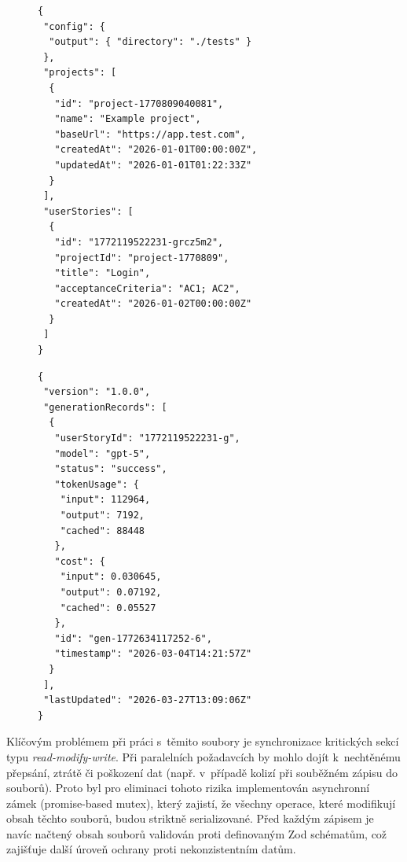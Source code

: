 \documentclass[czech, ing, kiv, he, iso690numb, viewonly]{fasthesis}
\begin{document}
\begin{figure}[H]
    \centering
    \begin{minipage}[t]{0.47\textwidth}
\begin{lstlisting}[style=jsoncode, basicstyle=\ttfamily\tiny, breaklines=true, breakatwhitespace=true, xleftmargin=1.5em, caption={\protect\centering Struktura \texttt{test-pilot.json}.}, label={lst:test-pilot-structure}]
{
 "config": {
  "output": { "directory": "./tests" }
 },
 "projects": [
  {
   "id": "project-1770809040081",
   "name": "Example project",
   "baseUrl": "https://app.test.com",
   "createdAt": "2026-01-01T00:00:00Z",
   "updatedAt": "2026-01-01T01:22:33Z"
  }
 ],
 "userStories": [
  {
   "id": "1772119522231-grcz5m2",
   "projectId": "project-1770809",
   "title": "Login",
   "acceptanceCriteria": "AC1; AC2",
   "createdAt": "2026-01-02T00:00:00Z"
  }
 ]
}
\end{lstlisting}
    \end{minipage}\hfill
    \begin{minipage}[t]{0.47\textwidth}
\begin{lstlisting}[style=jsoncode, basicstyle=\ttfamily\tiny, breaklines=true, breakatwhitespace=true, xleftmargin=1.5em, caption={\protect\centering Struktura \texttt{.testpilot-cache.json}.}, label={lst:cache-structure}]
{
 "version": "1.0.0",
 "generationRecords": [
  {
   "userStoryId": "1772119522231-g",
   "model": "gpt-5",
   "status": "success",
   "tokenUsage": {
    "input": 112964,
    "output": 7192,
    "cached": 88448
   },
   "cost": {
    "input": 0.030645,
    "output": 0.07192,
    "cached": 0.05527
   },
   "id": "gen-1772634117252-6",
   "timestamp": "2026-03-04T14:21:57Z"
  }
 ],
 "lastUpdated": "2026-03-27T13:09:06Z"
}
\end{lstlisting}
    \end{minipage}
\end{figure}

Klíčovým problémem při práci s~těmito soubory je synchronizace kritických sekcí typu \textit{read-modify-write}.
Při paralelních požadavcích by mohlo dojít k~nechtěnému přepsání, ztrátě či poškození dat (např. v~případě kolizí při souběžném zápisu do souborů).
Proto byl pro eliminaci tohoto rizika implementován asynchronní zámek (promise-based mutex), který zajistí, 
že všechny operace, které modifikují obsah těchto souborů, budou striktně serializované. Před každým zápisem je navíc 
načtený obsah souborů validován proti definovaným Zod schématům, což zajišťuje další úroveň ochrany proti nekonzistentním datům.
\end{document}
